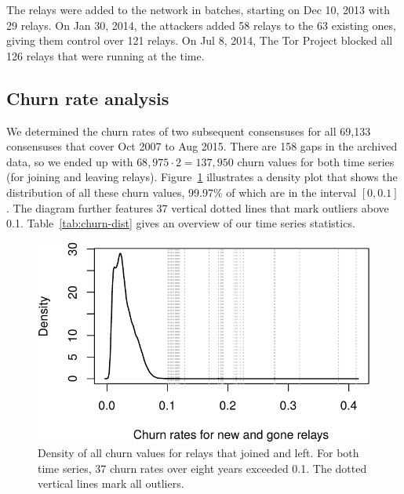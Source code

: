 The relays were added to the network in batches, starting on Dec 10, 2013 with
29 relays.  On Jan 30, 2014, the attackers added 58 relays to the 63 existing
ones, giving them control over 121 relays.  On Jul 8, 2014, The Tor Project
blocked all 126 relays that were running at the time.

% 

\subsection{Churn rate analysis}
\label{sec:churn}
We determined the churn rates of two subsequent consensuses for all 69,133
consensuses that cover Oct 2007 to Aug 2015.  There are 158 gaps in the
archived data, so we ended up with $68,975 \cdot 2 = 137,950$ churn values for
both time series (for joining and leaving relays).
Figure~\ref{fig:churn-density} illustrates a density plot that shows the
distribution of all these churn values, 99.97\% of which are in the interval
$[0, 0.1]$.  The diagram further features 37 vertical dotted lines that mark
outliers above 0.1.  Table~\ref{tab:churn-dist} gives an overview of our time
series statistics.

\begin{figure}[t]
	\centering
	\includegraphics[width=\linewidth]{diagrams/churn-density.pdf}
	\caption{Density of all churn values for relays that joined and left.  For
	both time series, 37 churn rates over eight years exceeded 0.1.  The dotted
	vertical lines mark all outliers.}
	\label{fig:churn-density}
\end{figure}

